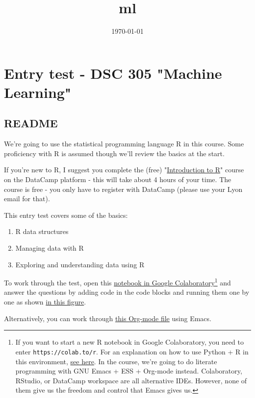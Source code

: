 \documentclass[11pt]{article}
\date{\today}
\title{ml}
\begin{document}
\maketitle
\tableofcontents

\section{Entry test - DSC 305 "Machine Learning"}
\label{sec:orgf74237a}
\subsection{README}
\label{sec:org55ab91f}

We're going to use the statistical programming language R in this
course. Some proficiency with R is assumed though we'll review the
basics at the start.

If you're new to R, I suggest you complete the (free) "\href{https://www.datacamp.com/courses/free-introduction-to-r}{Introduction to
R}" course on the DataCamp platform - this will take about 4 hours of
your time. The course is free - you only have to register with
DataCamp (please use your Lyon email for that).

This entry test covers some of the basics:
\begin{enumerate}
\item R data structures
\item Managing data with R
\item Exploring and understanding data using R
\end{enumerate}

To work through the test, open this \href{https://colab.research.google.com/drive/1FiCejT-5WwsnRcyB7OPfDcP0X-1HwFFi?usp=sharing}{notebook in Google
Colaboratory}\footnote{If you want to start a new R notebook in Google Colaboratory,
you need to enter \texttt{https://colab.to/r}. For an explanation on how to use
Python + R in this environment, \href{https://youtu.be/XasBV68Szk4}{see here}. In the course, we're going
to do literate programming with GNU Emacs + ESS + Org-mode
instead. Colaboratory, RStudio, or DataCamp workspace are all
alternative IDEs. However, none of them give us the freedom and
control that Emacs gives us.} and answer the questions by adding code in the code
blocks and running them one by one as shown \href{https://github.com/birkenkrahe/ml/blob/main/img/colab2.png}{in this figure}.

Alternatively, you can work through \href{https://raw.githubusercontent.com/birkenkrahe/ml/main/org/entrytest.org}{this Org-mode file} using Emacs.
\end{document}
